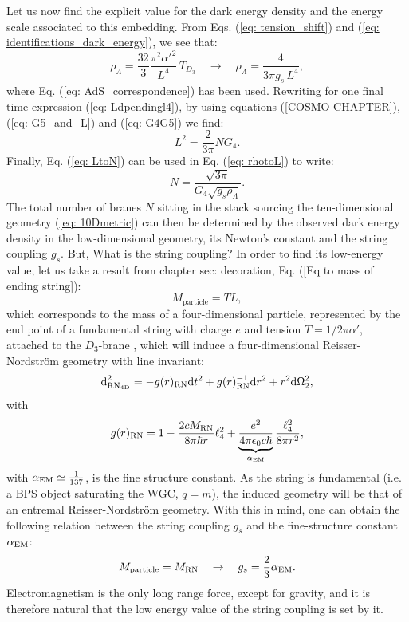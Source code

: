 Let us now find the explicit value for the dark energy density and the energy scale associated to this embedding. From Eqs. (\ref{eq: tension_shift}) and (\ref{eq: identifications_dark_energy}), we see that:
\begin{equation}\label{eq: rhotoL}
    \rho_{\Lambda} = \frac{32}{3} \frac{\pi^{2} \alpha'^{2}}{L^{4}} \, T_{D_3}  \quad \rightarrow \quad \rho_{\Lambda} = \frac{4}{3\pi g_{s}\, L^{4}}  ,
\end{equation}
where Eq. (\ref{eq: AdS_correspondence}) has been used. Rewriting  for one final time expression (\ref{eq: Ldpendingl4}), by using equations ([COSMO CHAPTER]), (\ref{eq: G5_and_L}) and (\ref{eq: G4G5}) we find:
\begin{equation}\label{eq: LtoN}
    L^2=\frac{2}{3\pi} N G_4.
\end{equation}
Finally, Eq. (\ref{eq: LtoN}) can be used in Eq. (\ref{eq: rhotoL}) to write:
\begin{equation}\label{eq: number_N}
    N = \frac{\sqrt{3 \pi}}{ G_4 \sqrt{g_{s} \rho_\Lambda}}.
\end{equation}
The total number of branes $N$ sitting in the stack sourcing the ten-dimensional geometry (\ref{eq: 10Dmetric}) can then be determined by the observed dark energy density in the low-dimensional geometry, its Newton's constant and the string coupling $g_{s}$. But, What is the string coupling? In order to find its low-energy value, let us take a result from chapter {sec: decoration}, Eq. ([Eq to mass of ending string]):
\begin{equation}
    M_{\text{particle}} = T L,
\end{equation}
which corresponds to the mass of a four-dimensional particle, represented by the end point of a fundamental string with charge $e$ and tension $T = 1/2\pi \alpha'$, attached to the $D_{3}$-brane \cite{Banerjee:2019aa}, which will induce a four-dimensional Reisser-Nordström geometry with line invariant:
\begin{equation}
    \text{d}_{\rm RN_{4D}}^{2} = - g(r)_{\rm RN} \text{d} t^{2} + g(r)_{\rm RN}^{-1} \text{d} r^{2} + r^{2} \text{d} \Omega_{2}^{2}, 
\end{equation}
with
\begin{equation}
    g(r)_{\rm RN} = 1 - \frac{2 c M_{\rm RN} }{8 \pi \hbar r } \ell_{4}^{2}  + \underbrace{\frac{e^{2}}{4\pi\epsilon_{0} c \hbar}}_{\alpha_{\rm EM}} \frac{\ell_{4}^{2}}{8 \pi r^{2}},
\end{equation}
with $\alpha_{\rm EM} \simeq \tfrac{1}{137}$, is the fine structure constant. As the string is fundamental (i.e. a BPS object saturating the WGC, $q = m$), the induced geometry will be that of an entremal Reisser-Nordström geometry. With this in mind, one can obtain the following relation between the string coupling $g_{s}$ and the fine-structure constant $\alpha_{\rm EM}$:
\begin{equation}\label{eq: gs_to_alpha}
    M_{\text{particle}} = M_{{\rm RN}} \quad \rightarrow \quad  g_{s} = \frac{2}{3} \alpha_{\rm EM}.
\end{equation}
Electromagnetism is the only long range force, except for gravity, and it is therefore natural that the low energy value of the string coupling is set by it.

